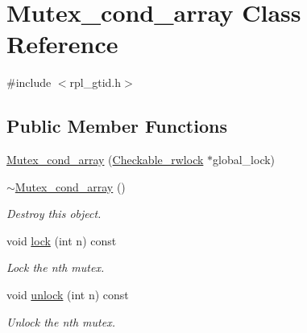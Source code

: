 \hypertarget{classMutex__cond__array}{}\section{Mutex\+\_\+cond\+\_\+array Class Reference}
\label{classMutex__cond__array}


{\ttfamily \#include $<$rpl\+\_\+gtid.\+h$>$}

\subsection*{Public Member Functions}
\begin{DoxyCompactItemize}
\item 
\mbox{\hyperlink{classMutex__cond__array_a7daf69af88f2693e9d8ba87a5fa59c2b}{Mutex\+\_\+cond\+\_\+array}} (\mbox{\hyperlink{classCheckable__rwlock}{Checkable\+\_\+rwlock}} $\ast$global\+\_\+lock)
\item 
\mbox{\label{classMutex__cond__array_a9dd09088240c27e11c270c43ff6c212b}} 
\mbox{\hyperlink{classMutex__cond__array_a9dd09088240c27e11c270c43ff6c212b}{$\sim$\+Mutex\+\_\+cond\+\_\+array}} ()
\begin{DoxyCompactList}\small\item\em Destroy this object. \end{DoxyCompactList}\item 
\mbox{\label{classMutex__cond__array_acefa8a4be4f750ef387b6cdcae78f1da}} 
void \mbox{\hyperlink{classMutex__cond__array_acefa8a4be4f750ef387b6cdcae78f1da}{lock}} (int n) const
\begin{DoxyCompactList}\small\item\em Lock the n\textquotesingle{}th mutex. \end{DoxyCompactList}\item 
\mbox{\label{classMutex__cond__array_ab2d612110e1544c730ab0e9986f75762}} 
void \mbox{\hyperlink{classMutex__cond__array_ab2d612110e1544c730ab0e9986f75762}{unlock}} (int n) const
\begin{DoxyCompactList}\small\item\em Unlock the n\textquotesingle{}th mutex. \end{DoxyCompactList}\item 
\mbox{\label{classMutex__cond__array_a814e7f07b28928ffe98a471581625775}} 

\end{DoxyCompactItemize}
